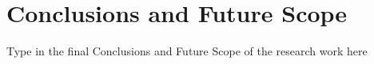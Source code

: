 \def\baselinestretch{1}
\chapter{Conclusions and Future Scope}
\graphicspath{{ConclusionsFutureScope/ConclusionsFutureScopeFigs/EPS/}{ConclusionsFutureScope/ConclusionsFutureScopeFigs/}}
\def\baselinestretch{1.66}

Type in the final Conclusions and Future Scope of the research work here 

